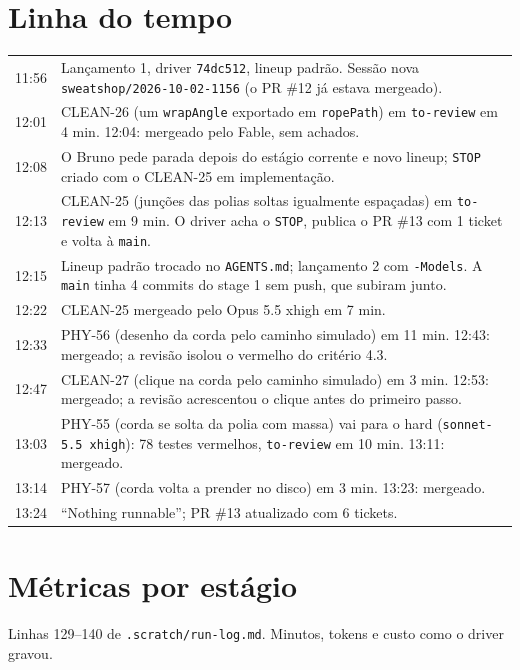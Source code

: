 \documentclass[11pt,a4paper]{article}
\begin{document}
\section{Linha do tempo}

\begin{tabularx}{\linewidth}{@{}lX@{}}
\toprule
11:56 & Lançamento 1, driver \texttt{74dc512}, lineup padrão. Sessão nova
        \texttt{sweatshop/2026-10-02-1156} (o PR \#12 já estava mergeado).\\
12:01 & CLEAN-26 (um \texttt{wrapAngle} exportado em \texttt{ropePath}) em
        \texttt{to-review} em 4 min. 12:04: mergeado pelo Fable, sem achados.\\
12:08 & O Bruno pede parada depois do estágio corrente e novo lineup;
        \texttt{STOP} criado com o CLEAN-25 em implementação.\\
12:13 & CLEAN-25 (junções das polias soltas igualmente espaçadas) em
        \texttt{to-review} em 9 min. O driver acha o \texttt{STOP}, publica o
        PR \#13 com 1 ticket e volta à \texttt{main}.\\
12:15 & Lineup padrão trocado no \texttt{AGENTS.md}; lançamento 2 com
        \texttt{-Models}. A \texttt{main} tinha 4 commits do stage 1 sem push,
        que subiram junto.\\
12:22 & CLEAN-25 mergeado pelo Opus 5.5 xhigh em 7 min.\\
12:33 & PHY-56 (desenho da corda pelo caminho simulado) em 11 min. 12:43:
        mergeado; a revisão isolou o vermelho do critério 4.3.\\
12:47 & CLEAN-27 (clique na corda pelo caminho simulado) em 3 min. 12:53:
        mergeado; a revisão acrescentou o clique antes do primeiro passo.\\
13:03 & PHY-55 (corda se solta da polia com massa) vai para o hard
        (\texttt{sonnet-5.5 xhigh}): 78 testes vermelhos, \texttt{to-review}
        em 10 min. 13:11: mergeado.\\
13:14 & PHY-57 (corda volta a prender no disco) em 3 min. 13:23: mergeado.\\
13:24 & ``Nothing runnable''; PR \#13 atualizado com 6 tickets.\\
\bottomrule
\end{tabularx}

\section{Métricas por estágio}

Linhas 129--140 de \texttt{.scratch/run-log.md}. Minutos, tokens e custo como o
driver gravou.
\end{document}
